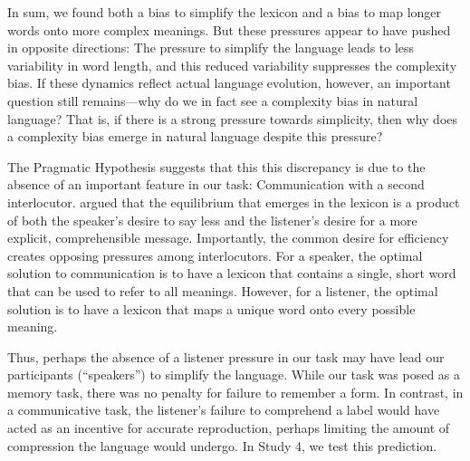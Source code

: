 

In sum, we found both a bias to simplify the lexicon and a bias to map longer words onto more complex meanings. But these pressures appear to have pushed in opposite directions: The pressure to simplify the language leads to less variability in word length, and this reduced variability suppresses the complexity bias. If these dynamics reflect actual language evolution, however, an important question still remains---why do we in fact see a complexity bias in natural language? That is, if there is a strong pressure towards simplicity, then why does a complexity bias emerge in natural language despite this pressure? 

The Pragmatic Hypothesis suggests that this this discrepancy is due to the absence of an important feature in our task: Communication with a second interlocutor.  argued that the equilibrium that emerges in the lexicon is a product of both the speaker's desire to say less and the listener's desire for a more explicit, comprehensible message. Importantly, the common desire for efficiency creates opposing pressures among interlocutors. For a speaker, the optimal solution to communication is to have a lexicon that contains a single, short word that can be used to refer to all meanings. However, for a listener, the optimal solution is to have a lexicon that maps a unique word onto every possible meaning. 

Thus, perhaps the absence of a listener pressure in our task may have lead our participants (``speakers'') to simplify the language. While our task was posed as a memory task, there was no penalty for failure to remember a form. In contrast, in a communicative task, the listener's failure to comprehend a label would have acted as an incentive for accurate reproduction, perhaps limiting the amount of compression the language would undergo.  In Study 4, we test this prediction.

